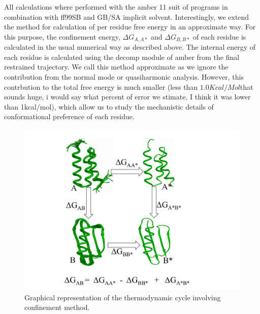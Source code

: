 \documentclass[12pt]{article}
\newcommand{\Alberto}[1]{\color{ForestGreen}#1\normalcolor }
\begin{document}
All calculations where performed with the amber 11 suit of programs in combination with ff99SB and
GB/SA implicit solvent. Interestingly, we extend the method for calculation of per residue free
energy in an approximate way. For this purpose, the confinement energy, $\Delta G_{A,A*}$ and
$\Delta G_{B,B*}$ of each residue is calculated in the usual numerical way as described above. The
internal energy of each residue is calculated using the decomp module of amber from the final
restrained trajectory. We call this method approximate as we ignore the contribution from the normal
mode or quasiharmonic analysis. However, this contrbution to the total free energy is much smaller
(less than $1.0 Kcal/Mol$\Alberto{that sounds huge, i would say what percent of error we stimate, I
think it was lower than 1kcal/mol}), which allow us to study the mechanistic details of
conformational preference of each residue.      



\begin{figure}
\begin{center}
\includegraphics[width=3.5 in,height=3.5 in]{method.pdf}
\end{center}
\caption{Graphical representation of the thermodynamic cycle involving confinement method.}
\label{fig:method}
\end{figure}
\end{document}
